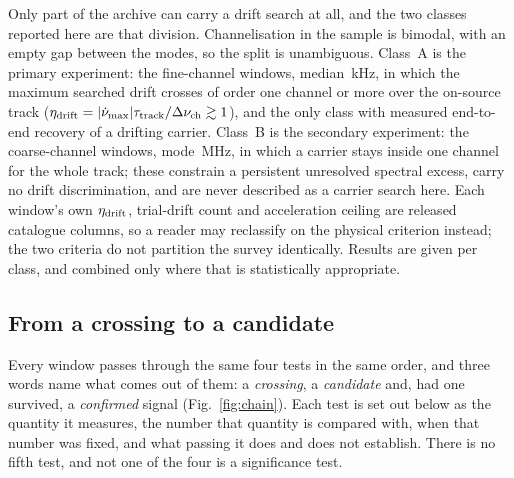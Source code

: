 Only part of the archive can carry a drift search at all, and the two
classes reported here are that division. Channelisation in the sample is
bimodal, with an empty gap between the modes, so the split is unambiguous.
Class~A is the primary experiment: the \NWinA{} fine-channel windows, median
\ChanAMedKHz\,kHz, in which the maximum searched drift crosses of order one
channel or more over the on-source track ($\eta_{\rm drift} =
|\dot\nu_{\max}|\tau_{\rm track}/\Delta\nu_{\rm ch} \gtrsim 1$), and the
only class with measured end-to-end recovery of a drifting carrier. Class~B
is the secondary experiment: the \NWinB{} coarse-channel windows, mode
\ChanBModeMHz\,MHz, in which a carrier stays inside one channel for the
whole track; these constrain a persistent unresolved spectral excess, carry
no drift discrimination, and are never described as a carrier search here.
Each window's own $\eta_{\rm drift}$, trial-drift count and acceleration
ceiling are released catalogue columns, so a reader may reclassify on the
physical criterion instead; the two criteria do not partition the survey
identically. Results are given per class, and combined only where that is
statistically appropriate.

\subsection{From a crossing to a candidate}
\label{sec:summary}

Every window passes through the same four tests in the same order, and
three words name what comes out of them: a \emph{crossing}, a
\emph{candidate} and, had one survived, a \emph{confirmed} signal
(Fig.~\ref{fig:chain}). Each test is set out below as the quantity it
measures, the number that quantity is compared with, when that number was
fixed, and what passing it does and does not establish. There is no fifth
test, and not one of the four is a significance test.

